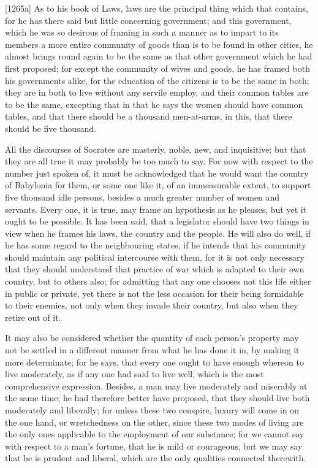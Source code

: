 [1265a] As to his book of Laws, laws are the principal thing which that
contains, for he has there said but little concerning government; and this
government, which he was so desirous of framing in such a manner as to
impart to its members a more entire community of goods than is to be found
in other cities, he almost brings round again to be the same as that other
government which he had first proposed; for except the community of wives
and goods, he has framed both his governments alike, for the education of
the citizens is to be the same in both; they are in both to live without
any servile employ, and their common tables are to be the same, excepting
that in that he says the women should have common tables, and that there
should be a thousand men-at-arms, in this, that there should be five
thousand.

All the discourses of Socrates are masterly, noble, new, and inquisitive;
but that they are all true it may probably be too much to say. For now
with respect to the number just spoken of, it must be acknowledged that he
would want the country of Babylonia for them, or some one like it, of an
immeasurable extent, to support five thousand idle persons, besides a much
greater number of women and servants. Every one, it is true, may frame an
hypothesis as he pleases, but yet it ought to be possible. It has been
said, that a legislator should have two things in view when he frames his
laws, the country and the people. He will also do well, if he has some
regard to the neighbouring states, if he intends that his community should
maintain any political intercourse with them, for it is not only necessary
that they should understand that practice of war which is adapted to their
own country, but to others also; for admitting that any one chooses not
this life either in public or private, yet there is not the less occasion
for their being formidable to their enemies, not only when they invade
their country, but also when they retire out of it.

It may also be considered whether the quantity of each person's property
may not be settled in a different manner from what he has done it in, by
making it more determinate; for he says, that every one ought to have
enough whereon to live moderately, as if any one had said to live well,
which is the most comprehensive expression. Besides, a man may live
moderately and miserably at the same time; he had therefore better have
proposed, that they should live both moderately and liberally; for unless
these two conspire, luxury will come in on the one hand, or wretchedness
on the other, since these two modes of living are the only ones applicable
to the employment of our substance; for we cannot say with respect to a
man's fortune, that he is mild or courageous, but we may say that he is
prudent and liberal, which are the only qualities connected therewith.

